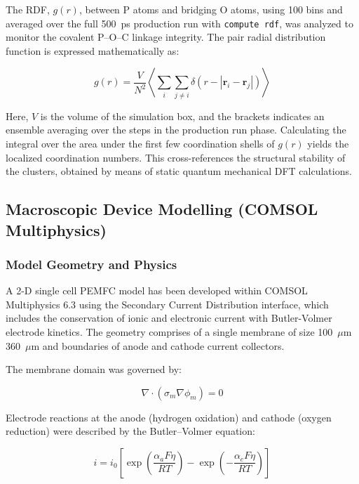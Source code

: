 \documentclass[12pt,a4paper]{report}
\begin{document}
The RDF, $g(r)$, between P atoms and bridging O atoms, using 100 bins and averaged over the full 500~ps production run with \texttt{compute rdf}, was analyzed to monitor the covalent P–O–C linkage integrity. The pair radial distribution function is expressed mathematically as:

\begin{equation}
g(r) = \frac{V}{N^2} \left\langle \sum_{i} \sum_{j \neq i} \delta(r - |\mathbf{r}_i - \mathbf{r}_j|) \right\rangle
\end{equation}

Here, $V$ is the volume of the simulation box, and the brackets indicates an ensemble averaging over the steps in the production run phase. Calculating the integral over the area under the first few coordination shells of $g(r)$ yields the localized coordination numbers. This cross-references the structural stability of the clusters, obtained by means of static quantum mechanical DFT calculations.


\subsection{Macroscopic Device Modelling (COMSOL Multiphysics)}

\subsubsection{Model Geometry and Physics}

A 2-D single cell PEMFC model has been developed within COMSOL Multiphysics 6.3 using the Secondary Current Distribution interface, which includes the conservation of ionic and electronic current with Butler-Volmer electrode kinetics. The geometry comprises of a single membrane of size 100~\(\mu\)m 360~\(\mu\)m and boundaries of anode and cathode current collectors.

The membrane domain was governed by:

\begin{equation}
\nabla \cdot \left( \sigma_{m} \nabla \phi_{m} \right) = 0
\end{equation}

Electrode reactions at the anode (hydrogen oxidation) and cathode 
(oxygen reduction) were described by the Butler--Volmer equation:

\begin{equation}
i = i_0 \left[ 
\exp\!\left(\frac{\alpha_a F \eta}{RT}\right) - 
\exp\!\left(-\frac{\alpha_c F \eta}{RT}\right) 
\right]
\end{equation}
\end{document}
